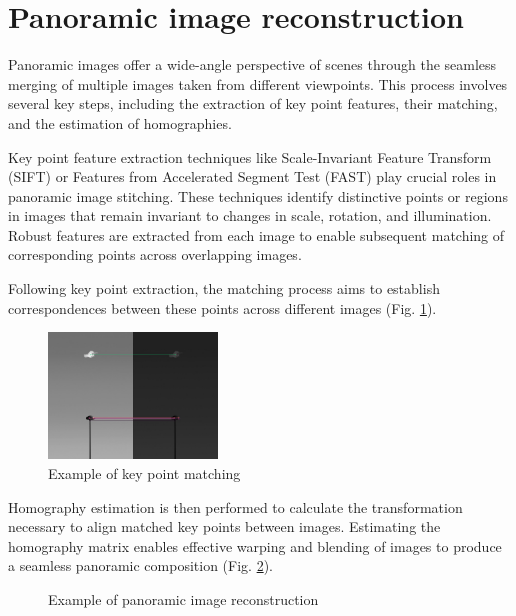\section{Panoramic image reconstruction}

Panoramic images offer a wide-angle perspective of scenes through the seamless merging of multiple images taken from different viewpoints. This process involves several key steps, including the extraction of key point features, their matching, and the estimation of homographies.

Key point feature extraction techniques like Scale-Invariant Feature Transform (SIFT) or Features from Accelerated Segment Test (FAST) play crucial roles in panoramic image stitching. These techniques identify distinctive points or regions in images that remain invariant to changes in scale, rotation, and illumination. Robust features are extracted from each image to enable subsequent matching of corresponding points across overlapping images.

Following key point extraction, the matching process aims to establish correspondences between these points across different images (Fig. \ref{fig:homog_example}).

\begin{figure}[H]
    \centering
    \includegraphics[width=0.4\textwidth]{../sift_algorithm/img/final.png}
    \caption{Example of key point matching}
    \label{fig:homog_example}
\end{figure}

Homography estimation is then performed to calculate the transformation necessary to align matched key points between images. Estimating the homography matrix enables effective warping and blending of images to produce a seamless panoramic composition (Fig. \ref{fig:pano}). 

\begin{figure}[H]
    \centering
     \qquad
    \caption{Example of panoramic image reconstruction}
    \label{fig:pano}
\end{figure}
